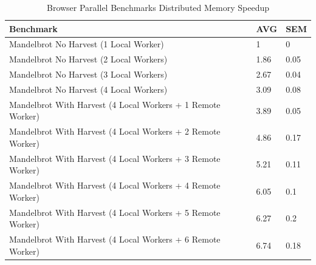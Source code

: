 \documentclass[oneside]{um-fict}
\begin{document}
\begin{table}[H]
    \begin{center}
        \begin{tabular}{|l|ll|}
            \hline
            Benchmark                                                   & AVG & SEM \\ \hline
            Mandelbrot No Harvest (1 Local Worker)                      & 1       & 0              \\
            Mandelbrot No Harvest (2 Local Workers)                     & 1.86    & 0.05           \\
            Mandelbrot No Harvest (3 Local Workers)                     & 2.67    & 0.04           \\
            Mandelbrot No Harvest (4 Local Workers)                     & 3.09    & 0.08           \\
            Mandelbrot With Harvest (4 Local Workers + 1 Remote Worker) & 3.89    & 0.05           \\
            Mandelbrot With Harvest (4 Local Workers + 2 Remote Worker) & 4.86    & 0.17           \\
            Mandelbrot With Harvest (4 Local Workers + 3 Remote Worker) & 5.21    & 0.11           \\
            Mandelbrot With Harvest (4 Local Workers + 4 Remote Worker) & 6.05    & 0.1            \\
            Mandelbrot With Harvest (4 Local Workers + 5 Remote Worker) & 6.27    & 0.2            \\
            Mandelbrot With Harvest (4 Local Workers + 6 Remote Worker) & 6.74    & 0.18           \\ \hline
        \end{tabular}
        \caption{Browser Parallel Benchmarks Distributed Memory Speedup}\label{tab:browserdistributedmemoryspeedup}
    \end{center}
\end{table}
\end{document}
